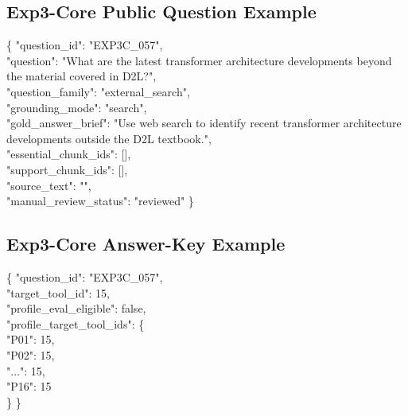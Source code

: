 \subsection{Exp3-Core Public Question Example}
\begin{shadedquotation}
\{
    "question\_id": "EXP3C\_057", \\
    "question": "What are the latest transformer architecture developments beyond the material covered in D2L?", \\
    "question\_family": "external\_search", \\
    "grounding\_mode": "search", \\
    "gold\_answer\_brief": "Use web search to identify recent transformer architecture developments outside the D2L textbook.", \\
    "essential\_chunk\_ids": [], \\
    "support\_chunk\_ids": [], \\
    "source\_text": "", \\
    "manual\_review\_status": "reviewed"
\}
\end{shadedquotation}

\subsection{Exp3-Core Answer-Key Example}
\begin{shadedquotation}
\{
    "question\_id": "EXP3C\_057", \\
    "target\_tool\_id": 15, \\
    "profile\_eval\_eligible": false, \\
    "profile\_target\_tool\_ids": \{ \\
        "P01": 15, \\
        "P02": 15, \\
        "...": 15, \\
        "P16": 15 \\
    \}
\}
\end{shadedquotation}

\resumetocwriting

